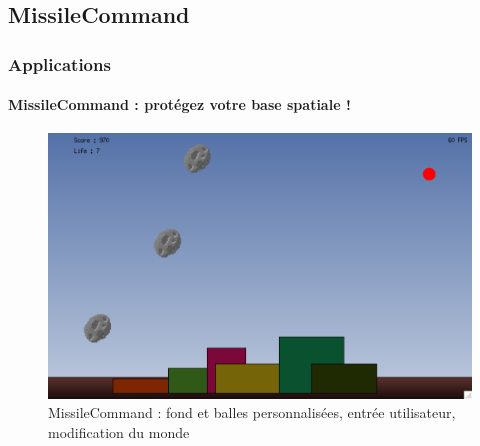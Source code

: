 \documentclass[xcolor=x11names,compress,11pt]{beamer}
\renewcommand{\(}{\begin{columns}}
\renewcommand{\)}{\end{columns}}
\newcommand{\<}[1]{\begin{column}{#1}}
\renewcommand{\>}{\end{column}}
\begin{document}
\subsection*{MissileCommand}
\begin{frame}
  \frametitle{Applications}
  \framesubtitle{MissileCommand : protégez votre base spatiale !}
  \begin{figure}[h]
    \centering
    \includegraphics[scale=0.27]{missilecommand.pdf}
    \caption{MissileCommand : fond et balles personnalisées, entrée utilisateur, modification du monde}
  \end{figure}
\end{frame}
\end{document}
